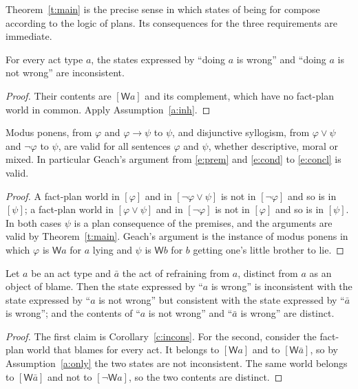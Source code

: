 \documentclass{situationist-preprint}
\begin{document}
Theorem~\ref{t:main} is the precise sense in which states of being for compose according to the logic of plans. Its consequences for the three requirements are immediate.

\begin{corollary}\label{c:incons}
For every act type $a$, the states expressed by \enquote{doing $a$ is wrong} and \enquote{doing $a$ is not wrong} are inconsistent.
\end{corollary}

\begin{proof}
Their contents are $[\mathsf{W}a]$ and its complement, which have no fact-plan world in common. Apply Assumption~\ref{a:inh}.
\end{proof}

\begin{corollary}\label{c:mp}
Modus ponens, from $\varphi$ and $\varphi\to\psi$ to $\psi$, and disjunctive syllogism, from $\varphi\vee\psi$ and $\neg\varphi$ to $\psi$, are valid for all sentences $\varphi$ and $\psi$, whether descriptive, moral or mixed. In particular Geach's argument from \ref{e:prem} and \ref{e:cond} to \ref{e:concl} is valid.
\end{corollary}

\begin{proof}
A fact-plan world in $[\varphi]$ and in $[\neg\varphi\vee\psi]$ is not in $[\neg\varphi]$ and so is in $[\psi]$; a fact-plan world in $[\varphi\vee\psi]$ and in $[\neg\varphi]$ is not in $[\varphi]$ and so is in $[\psi]$. In both cases $\psi$ is a plan consequence of the premises, and the arguments are valid by Theorem~\ref{t:main}. Geach's argument is the instance of modus ponens in which $\varphi$ is $\mathsf{W}a$ for $a$ lying and $\psi$ is $\mathsf{W}b$ for $b$ getting one's little brother to lie.
\end{proof}

\begin{proposition}\label{p:neg}
Let $a$ be an act type and $\bar a$ the act of refraining from $a$, distinct from $a$ as an object of blame. Then the state expressed by \enquote{$a$ is wrong} is inconsistent with the state expressed by \enquote{$a$ is not wrong} but consistent with the state expressed by \enquote{$\bar a$ is wrong}; and the contents of \enquote{$a$ is not wrong} and \enquote{$\bar a$ is wrong} are distinct.
\end{proposition}

\begin{proof}
The first claim is Corollary~\ref{c:incons}. For the second, consider the fact-plan world that blames for every act. It belongs to $[\mathsf{W}a]$ and to $[\mathsf{W}\bar a]$, so by Assumption~\ref{a:only} the two states are not inconsistent. The same world belongs to $[\mathsf{W}\bar a]$ and not to $[\neg\mathsf{W}a]$, so the two contents are distinct.
\end{proof}
\end{document}
